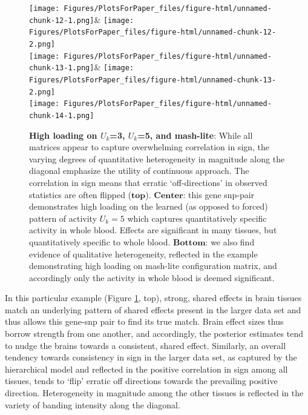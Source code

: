 \begin{figure}[htbp]
\texttt{[image: Figures/PlotsForPaper\_files/figure-html/unnamed-chunk-12-1.png]}&
\texttt{[image: Figures/PlotsForPaper\_files/figure-html/unnamed-chunk-12-2.png]}\\
\texttt{[image: Figures/PlotsForPaper\_files/figure-html/unnamed-chunk-13-1.png]}&
\texttt{[image: Figures/PlotsForPaper\_files/figure-html/unnamed-chunk-13-2.png]}\\
\texttt{[image: Figures/PlotsForPaper\_files/figure-html/unnamed-chunk-14-1.png]}\\
\caption{\textbf{High loading on $U_{k}$=3, $U_{k}$=5, and mash-lite}:  While all matrices appear to capture overwhelming correlation in sign, the varying degrees of quantitative heterogeneity in magnitude along the diagonal emphasize the utility of continuous approach. The correlation in sign means that erratic `off-directions' in observed statistics are often flipped ($\textbf{top}$). $\textbf{Center}$: this gene snp-pair demonstrates high loading on the learned (as opposed to forced) pattern of activity $U_{k}=5$ which captures quantitatively specific activity in whole blood. Effects are significant in many tissues, but quantitatively specific to whole blood. $\textbf{Bottom}$: we also find evidence of qualitative heterogeneity, reflected in the example demonstrating high loading on mash-lite configuration matrix, and accordingly only the activity in whole blood is deemed significant.}
\label{fig:uk3}
\end{figure}


In this particular example (Figure \ref{fig:uk3}, top), strong, shared effects in brain tissues match an underlying pattern of shared effects present in the larger data set and thus allows this gene-snp pair to find its true match. Brain effect sizes thus borrow strength from one another, and accordingly, the posterior estimates tend to nudge the brains towards a consistent, shared effect. Similarly, an overall tendency towards consistency in sign in the larger data set, as captured by the hierarchical model and reflected in the positive correlation in sign among all tissues, tends to `flip' erratic off directions towards the prevailing positive direction. Heterogeneity in magnitude among the other tissues is reflected in the variety of banding intensity along the diagonal.\newline

